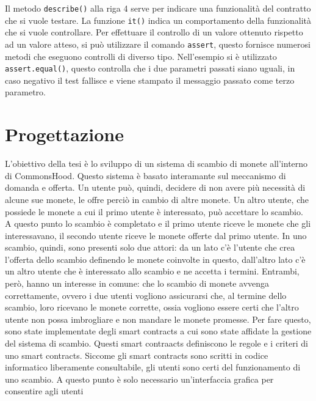 \documentclass[a4paper]{article}
\begin{document}
        Il metodo \verb|describe()| alla riga 4 serve per indicare una funzionalità del contratto che si vuole testare.
        La funzione \verb|it()| indica un comportamento della funzionalità che si vuole controllare.
        \newline
        Per effettuare il controllo di un valore ottenuto rispetto ad un valore atteso, si può utilizzare il comando \verb|assert|, questo fornisce numerosi metodi che eseguono controlli di diverso tipo.
        Nell'esempio si è utilizzato \verb|assert.equal()|, questo controlla che i due parametri passati siano uguali, in caso negativo il test fallisce e viene stampato il messaggio passato come terzo parametro.
        \newpage

        \section{Progettazione}
        L'obiettivo della tesi è lo sviluppo di un sistema di scambio di monete all'interno di CommonsHood. Questo sistema è basato interamante sul meccanismo di domanda e offerta.
        Un utente può, quindi, decidere di non avere più necessità di alcune sue monete, le offre perciò in cambio di altre monete. Un altro utente, che possiede le monete a cui il primo utente è interessato, può accettare lo scambio.
        A questo punto lo scambio è completato e il primo utente riceve le monete che gli interessavano, il secondo utente riceve le monete offerte dal primo utente. In uno scambio, quindi, sono presenti solo due attori:
        da un lato c'è l'utente che crea l'offerta dello scambio definendo le monete coinvolte in questo, dall'altro lato c'è un altro utente che è interessato allo scambio e ne accetta i termini.
        Entrambi, però, hanno un interesse in comune: che lo scambio di monete avvenga correttamente, ovvero i due utenti vogliono assicurarsi che, al termine dello scambio, loro ricevano le monete corrette, ossia vogliono essere certi che l'altro utente
        non possa imbrogliare e non mandare le monete promesse.
        \newline
        Per fare questo, sono state implementate degli smart contracts a cui sono state affidate la gestione del sistema di scambio. Questi smart contraacts definiscono le regole e i criteri di uno smart contracts.
        Siccome gli smart contracts sono scritti in codice informatico liberamente consultabile, gli utenti sono certi del funzionamento di uno scambio. A questo punto è solo necessario un'interfaccia grafica per consentire agli utenti
\end{document}
